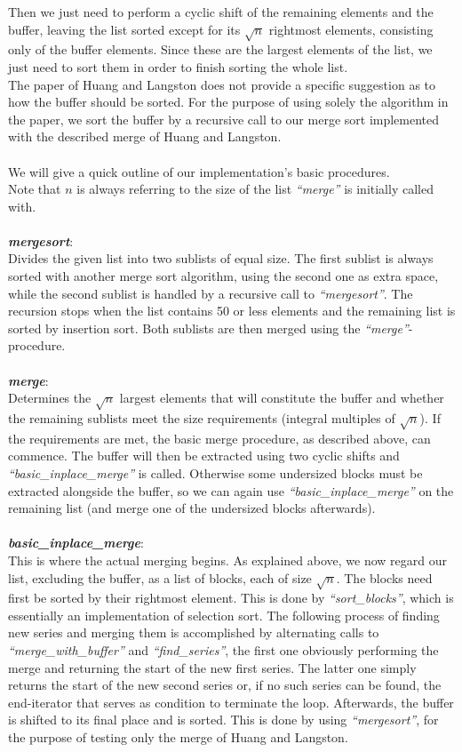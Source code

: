 \documentclass[11pt,pdftex,a4paper, twocolumn]{article}
\begin{document}
Then we just need to perform a cyclic shift of the remaining elements and the buffer, leaving the list sorted except for its $\sqrt{n}$ rightmost elements, consisting only of the buffer elements. Since these are the largest elements of the list, we just need to sort them in order to finish sorting the whole list. \\
The paper of Huang and Langston does not provide a specific suggestion as to how the buffer should be sorted. For the purpose of using solely the algorithm in the paper, we sort the buffer by a recursive call to our merge sort implemented with the described merge of Huang and Langston. \\
$ $ \\
We will give a quick outline of our implementation’s basic procedures. \\
Note that $n$ is always referring to the size of the list \textit{“merge”} is initially called with. \\
$ $ \\
\textbf{\textit{mergesort}}: \\
Divides the given list into two sublists of equal size. The first sublist is always sorted with another merge sort algorithm, using the second one as extra space, while the second sublist is handled by a recursive call to \textit{“mergesort”}. The recursion stops when the list contains 50 or less elements and the remaining list is sorted by insertion sort.  Both sublists are then merged using the \textit{“merge”}-procedure. \\
$ $ \\
\textbf{\textit{merge}}: \\
Determines the $\sqrt{n}$ largest elements that will constitute the buffer and whether the remaining sublists meet the size requirements (integral multiples of $\sqrt{n}$). If the requirements are met, the basic merge procedure, as described above, can commence. The buffer will then be extracted using two cyclic shifts and \textit{“basic\_inplace\_merge”} is called. Otherwise some undersized blocks must be extracted alongside the buffer, so we can again use \textit{“basic\_inplace\_merge”} on the remaining list (and merge one of the undersized blocks afterwards). \\
$ $ \\
\textbf{\textit{basic\_inplace\_merge}}: \\
This is where the actual merging begins. As explained above, we now regard our list, excluding the buffer, as a list of blocks, each of size $\sqrt{n}$. The blocks need first be sorted by their rightmost element. This is done by \textit{“sort\_blocks”}, which is essentially an implementation of selection sort. The following process of finding new series and merging them is accomplished by alternating calls to \textit{“merge\_with\_buffer”} and \textit{“find\_series”}, the first one obviously performing the merge and returning the start of the new first series. The latter one simply returns the start of the new second series or, if no such series can be found, the end-iterator that serves as condition to terminate the loop. Afterwards, the buffer is shifted to its final place and is sorted. This is done by using \textit{“mergesort”}, for the purpose of testing only the merge of Huang and Langston. \\
\end{document}
